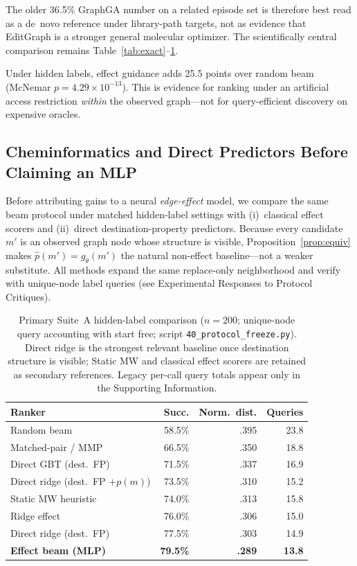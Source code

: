 \documentclass[journal=jcisd8,manuscript=article,email=false]{achemso}
\begin{document}
The older 36.5\% GraphGA number on a related episode set is therefore best read as a de~novo reference under library-path targets, not as evidence that EditGraph is a stronger general molecular optimizer. The scientifically central comparison remains Table~\ref{tab:exact}--\ref{tab:direct}.

Under hidden labels, effect guidance adds 25.5 points over random beam (McNemar $p=4.29\times10^{-13}$). This is evidence for ranking under an artificial access restriction \emph{within} the observed graph---not for query-efficient discovery on expensive oracles.

\subsection{Cheminformatics and Direct Predictors Before Claiming an MLP}
\label{sec:chem_baselines}

Before attributing gains to a neural \emph{edge-effect} model, we compare the same beam protocol under matched hidden-label settings with (i)~classical effect scorers and (ii)~direct destination-property predictors. Because every candidate $m'$ is an observed graph node whose structure is visible, Proposition~\ref{prop:equiv} makes $\widehat{p}(m')=g_\theta(m')$ the natural non-effect baseline---not a weaker substitute. All methods expand the same replace-only neighborhood and verify with unique-node label queries (see Experimental Responses to Protocol Critiques).

\begin{table}[t]
\caption{Primary Suite~A hidden-label comparison ($n{=}200$; unique-node query accounting with start free; script \texttt{40\_protocol\_freeze.py}). Direct ridge is the strongest relevant baseline once destination structure is visible; Static MW and classical effect scorers are retained as secondary references. Legacy per-call query totals appear only in the Supporting Information.}
\label{tab:direct}
\centering
\small
\begin{tabular}{lrrr}
\toprule
Ranker & Succ. & Norm.\ dist. & Queries \\
\midrule
Random beam & 58.5\% & .395 & 23.8 \\
Matched-pair / MMP & 66.5\% & .350 & 18.8 \\
Direct GBT (dest.\ FP) & 71.5\% & .337 & 16.9 \\
Direct ridge (dest.\ FP $+p(m)$) & 73.5\% & .310 & 15.2 \\
Static MW heuristic & 74.0\% & .313 & 15.8 \\
Ridge effect & 76.0\% & .306 & 15.0 \\
Direct ridge (dest.\ FP) & 77.5\% & .303 & 14.9 \\
\textbf{Effect beam (MLP)} & \textbf{79.5\%} & \textbf{.289} & \textbf{13.8} \\
\bottomrule
\end{tabular}
\end{table}
\end{document}
